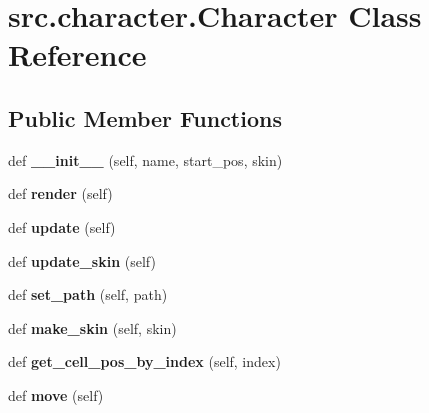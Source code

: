 \hypertarget{classsrc_1_1character_1_1_character}{}\section{src.\+character.\+Character Class Reference}
\label{classsrc_1_1character_1_1_character}
\subsection*{Public Member Functions}
\begin{DoxyCompactItemize}
\item 
\hypertarget{classsrc_1_1character_1_1_character_af74db8502f8bb86e614529a6ed7bc57c}{}\label{classsrc_1_1character_1_1_character_af74db8502f8bb86e614529a6ed7bc57c} 
def {\bfseries \+\_\+\+\_\+init\+\_\+\+\_\+} (self, name, start\+\_\+pos, skin)
\item 
\hypertarget{classsrc_1_1character_1_1_character_a21d16353a64a8730f2f6341451a457a9}{}\label{classsrc_1_1character_1_1_character_a21d16353a64a8730f2f6341451a457a9} 
def {\bfseries render} (self)
\item 
\hypertarget{classsrc_1_1character_1_1_character_a5e53496a0483292361ea1532bbeaa47d}{}\label{classsrc_1_1character_1_1_character_a5e53496a0483292361ea1532bbeaa47d} 
def {\bfseries update} (self)
\item 
\hypertarget{classsrc_1_1character_1_1_character_a97a09c01bf2d7963874782479365c77b}{}\label{classsrc_1_1character_1_1_character_a97a09c01bf2d7963874782479365c77b} 
def {\bfseries update\+\_\+skin} (self)
\item 
\hypertarget{classsrc_1_1character_1_1_character_a5d34ff7bdc27425912f851e5e27abd52}{}\label{classsrc_1_1character_1_1_character_a5d34ff7bdc27425912f851e5e27abd52} 
def {\bfseries set\+\_\+path} (self, path)
\item 
\hypertarget{classsrc_1_1character_1_1_character_aef8310d8a918f3340e0e1eba4e3579b9}{}\label{classsrc_1_1character_1_1_character_aef8310d8a918f3340e0e1eba4e3579b9} 
def {\bfseries make\+\_\+skin} (self, skin)
\item 
\hypertarget{classsrc_1_1character_1_1_character_a0023ee2e4f3051135a1846940cd6d963}{}\label{classsrc_1_1character_1_1_character_a0023ee2e4f3051135a1846940cd6d963} 
def {\bfseries get\+\_\+cell\+\_\+pos\+\_\+by\+\_\+index} (self, index)
\item 
\hypertarget{classsrc_1_1character_1_1_character_a44dd337e1138d1b598d3f8af267f4279}{}\label{classsrc_1_1character_1_1_character_a44dd337e1138d1b598d3f8af267f4279} 
def {\bfseries move} (self)
\end{DoxyCompactItemize}
